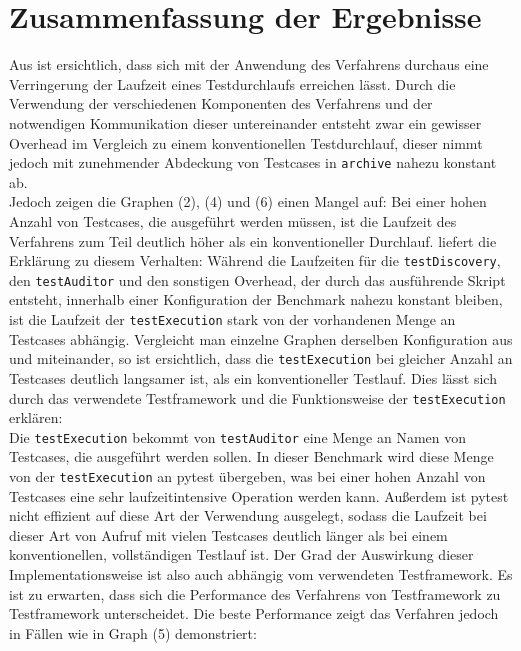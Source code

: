 \section{Zusammenfassung der Ergebnisse}\label{chap:summary_benchmark}
Aus  ist ersichtlich, dass sich mit der Anwendung des Verfahrens durchaus eine Verringerung der Laufzeit eines Testdurchlaufs erreichen lässt. Durch die Verwendung der verschiedenen Komponenten des Verfahrens und der notwendigen Kommunikation dieser untereinander entsteht zwar ein gewisser Overhead im Vergleich zu einem konventionellen Testdurchlauf, dieser nimmt jedoch mit zunehmender Abdeckung von Testcases in \texttt{archive} nahezu konstant ab.\\
Jedoch zeigen die Graphen (2), (4) und (6) einen Mangel auf: Bei einer hohen Anzahl von Testcases, die ausgeführt werden müssen, ist die Laufzeit des Verfahrens zum Teil deutlich höher als ein konventioneller Durchlauf.  liefert die Erklärung zu diesem Verhalten: Während die Laufzeiten für die \texttt{testDiscovery}, den \texttt{testAuditor} und den sonstigen Overhead, der durch das ausführende Skript entsteht, innerhalb einer Konfiguration der Benchmark nahezu konstant bleiben, ist die Laufzeit der \texttt{testExecution} stark von der vorhandenen Menge an Testcases abhängig. Vergleicht man einzelne Graphen derselben Konfiguration aus  und  miteinander, so ist ersichtlich, dass die \texttt{testExecution} bei gleicher Anzahl an Testcases deutlich langsamer ist, als ein konventioneller Testlauf. Dies lässt sich durch das verwendete Testframework und die Funktionsweise der \texttt{testExecution} erklären:\\
Die \texttt{testExecution} bekommt von \texttt{testAuditor} eine Menge an Namen von Testcases, die ausgeführt werden sollen. In dieser Benchmark wird diese Menge von der \texttt{testExecution} an pytest übergeben, was bei einer hohen Anzahl von Testcases eine sehr laufzeitintensive Operation werden kann. Außerdem ist pytest nicht effizient auf diese Art der Verwendung ausgelegt, sodass die Laufzeit bei dieser Art von Aufruf mit vielen Testcases deutlich länger als bei einem konventionellen, vollständigen Testlauf ist. Der Grad der Auswirkung dieser Implementationsweise ist also auch abhängig vom verwendeten Testframework. Es ist zu erwarten, dass sich die Performance des Verfahrens von Testframework zu Testframework unterscheidet.
\newpage
Die beste Performance zeigt das Verfahren jedoch in Fällen wie in Graph (5) demonstriert:\\
